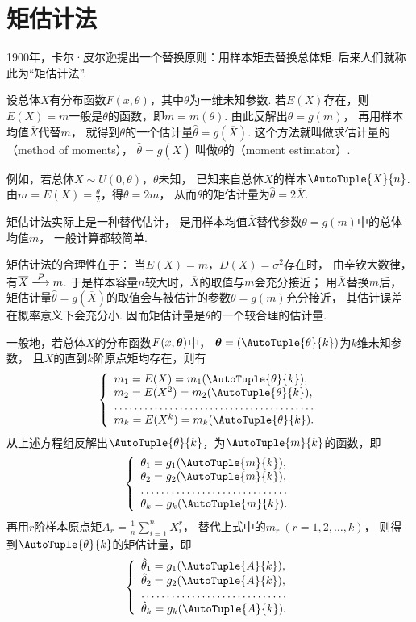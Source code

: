 \section{矩估计法}
1900年，卡尔·皮尔逊提出一个替换原则：用样本矩去替换总体矩.
后来人们就称此为“矩估计法”.

设总体\(X\)有分布函数\(F(x,\theta)\)，其中\(\theta\)为一维未知参数.
若\(E(X)\)存在，则\(E(X)=m\)一般是\(\theta\)的函数，即\(m=m(\theta)\).
由此反解出\(\theta=g(m)\)，
再用样本均值\(\overline{X}\)代替\(m\)，
就得到\(\theta\)的一个估计量\(\hat{\theta}=g(\overline{X})\).
这个方法就叫做求估计量的（method of moments），
\(\hat{\theta}=g(\overline{X})\)
叫做\(\theta\)的（moment estimator）.

例如，若总体\(X \sim U(0,\theta)\)，\(\theta\)未知，
已知来自总体\(X\)的样本\(\AutoTuple{X}{n}\).
由\(m = E(X) = \frac{\theta}{2}\)，得\(\theta=2m\)，
从而\(\theta\)的矩估计量为\(\hat{\theta} = 2\overline{X}\).

矩估计法实际上是一种替代估计，
是用样本均值\(\overline{X}\)替代参数\(\theta=g(m)\)中的总体均值\(m\)，
一般计算都较简单.

矩估计法的合理性在于：
当\(E(X)=m\)，\(D(X)=\sigma^2\)存在时，
由辛钦大数律，有\(\overline{X} \toP m\).
于是样本容量\(n\)较大时，\(\overline{X}\)的取值与\(m\)会充分接近；
用\(\overline{X}\)替换\(m\)后，
矩估计量\(\hat{\theta}=g(\overline{X})\)的取值会与被估计的参数\(\theta=g(m)\)充分接近，
其估计误差在概率意义下会充分小.
因而矩估计量是\(\theta\)的一个较合理的估计量.

一般地，若总体\(X\)的分布函数\(F(x,\boldsymbol{\theta})\)中，
\(\vb{\theta}=(\AutoTuple{\theta}{k})\)为\(k\)维未知参数，
且\(X\)的直到\(k\)阶原点矩均存在，则有\[
	\def\m#1{m_{#1} = E(X\ifthenelse{\equal{#1}{1}}{}{^{#1}}) = m_{#1}(\AutoTuple{\theta}{k})}
	\left\{ \begin{array}{l}
		\m{1}, \\
		\m{2}, \\
		\hdotsfor{1} \\
		\m{k}. \\
	\end{array} \right.
\]
从上述方程组反解出\(\AutoTuple{\theta}{k}\)，为\(\AutoTuple{m}{k}\)的函数，即\[
	\def\g#1{\theta_{#1}=g_{#1}(\AutoTuple{m}{k})}
	\left\{ \begin{array}{l}
		\g{1}, \\
		\g{2}, \\
		\hdotsfor{1} \\
		\g{k}. \\
	\end{array} \right.
\]
再用\(r\)阶样本原点矩\(A_r = \frac{1}{n} \sum_{i=1}^n{X_i^r}\)，
替代上式中的\(m_r\ (r=1,2,\dots,k)\)，
则得到\(\AutoTuple{\theta}{k}\)的矩估计量，即\[
	\def\g#1{\hat{\theta}_{#1}=g_{#1}(\AutoTuple{A}{k})}
	\left\{ \begin{array}{l}
		\g{1}, \\
		\g{2}, \\
		\hdotsfor{1} \\
		\g{k}. \\
	\end{array} \right.
\]

